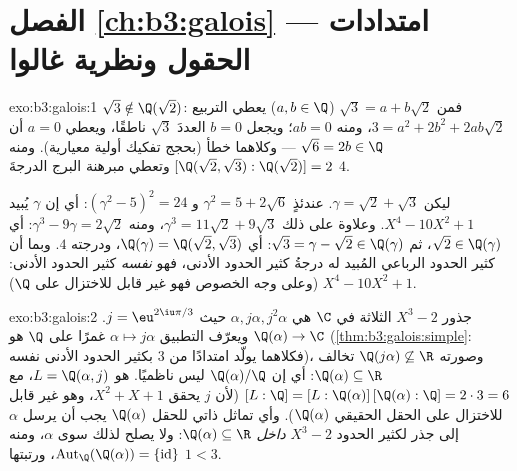 \section*{الفصل \ref{ch:b3:galois} --- امتدادات الحقول ونظرية
غالوا}

\begin{solution}{exo:b3:galois:1}
$\sqrt3 \notin \Q(\sqrt2)$: فمن $\sqrt3 = a + b\sqrt2$ ($a, b
\in \Q$) يعطي التربيع $3 = a^2 + 2b^2 + 2ab\sqrt2$، ومنه $ab =
0$؛ ويجعل
$b = 0$ العددَ $\sqrt3$ ناطقًا، ويعطي $a = 0$ أن $\sqrt6 = 2b
\in \Q$ --- وكلاهما
خطأ (بحجج تفكيك أولية معيارية). ومنه $[\Q(\sqrt2,\sqrt3) : \Q(\sqrt2)] = 2$ وتعطي مبرهنة البرج
الدرجةَ $4$.

ليكن $\gamma = \sqrt2 + \sqrt3$. عندئذٍ $\gamma^2 = 5 + 2\sqrt6$ و $(\gamma^2 - 5)^2 = 24$: أي إن $\gamma$ يُبيد
$X^4 - 10X^2 + 1$. وعلاوة على ذلك $\gamma^3 = 11\sqrt2 + 9\sqrt3$، ومنه $\gamma^3 - 9\gamma
= 2\sqrt2$: أي $\sqrt2 \in \Q(\gamma)$، ثم
$\sqrt3 = \gamma -
\sqrt2 \in \Q(\gamma)$: أي $\Q(\gamma) = \Q(\sqrt2,\sqrt3)$، ودرجته $4$. وبما أن كثير الحدود الرباعي
المُبيد له درجةُ كثير الحدود الأدنى، فهو \emph{نفسه} كثير الحدود
الأدنى: $X^4 -
10X^2 + 1$ (وعلى وجه الخصوص فهو غير قابل للاختزال على $\Q$).
\end{solution}

\begin{solution}{exo:b3:galois:2}
جذور $X^3 - 2$ الثلاثة في $\C$ هي $\alpha, j\alpha,
j^2\alpha$ حيث $j = \eu^{2\iu\pi/3}$. ويعرّف
التطبيق $\alpha \mapsto
j\alpha$ غمرًا على $\Q$ هو $\Q(\alpha) \to \C$ (\cref{thm:b3:galois:simple}: فكلاهما
يولّد امتدادًا من  $3$ بكثير الحدود الأدنى نفسه)، وصورته
$\Q(j\alpha)
\not\subseteq \R$ تخالف $\Q(\alpha) \subseteq \R$: أي إن $\Q(\alpha)/\Q$ ليس ناظميًا.  هو $L =
\Q(\alpha, j)$، مع $[L:\Q] = [L:\Q(\alpha)]\,[\Q(\alpha):\Q] =
2 \cdot 3 = 6$ (لأن $j$ يحقق $X^2 + X + 1$، وهو
غير قابل للاختزال على الحقل الحقيقي $\Q(\alpha)$). وأي تماثل
ذاتي للحقل $\Q(\alpha)$ يجب أن يرسل $\alpha$ إلى جذر لكثير
الحدود $X^3 - 2$ \emph{داخل} $\Q(\alpha) \subseteq \R$: ولا يصلح لذلك سوى $\alpha$،
ومنه $\operatorname{Aut}_\Q(\Q(\alpha)) = \{\mathrm{id}\}$، ورتبتها $1 < 3$.
\end{solution}

